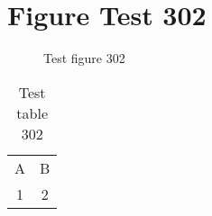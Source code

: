 \documentclass{article}
\begin{document}
\section{Figure Test 302}
\begin{figure}[h]
\caption{Test figure 302}
\end{figure}
\begin{table}[h]
\caption{Test table 302}
\begin{tabular}{cc}
A & B \\
1 & 2
\end{tabular}
\end{table}
\end{document}
